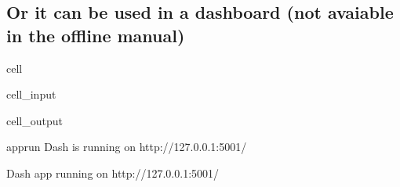 \documentclass[letterpaper,10pt,english]{jupyterBook}
\begin{document}
\subsection{Or it can be used in a dashboard (not avaiable in the offline manual)}
\label{\detokenize{content/06_ModelAnalytics/AttributionSomeFeatures:or-it-can-be-used-in-a-dashboard-not-avaiable-in-the-offline-manual}}
\begin{sphinxuseclass}{cell}\begin{sphinxVerbatimInput}

\begin{sphinxuseclass}{cell_input}
\begin{sphinxVerbatim}[commandchars=\\\{\}]
\end{sphinxVerbatim}

\end{sphinxuseclass}\end{sphinxVerbatimInput}
\begin{sphinxVerbatimOutput}

\begin{sphinxuseclass}{cell_output}
\begin{sphinxVerbatim}[commandchars=\\\{\}]
apprun
Dash is running on http://127.0.0.1:5001/
\end{sphinxVerbatim}

\begin{sphinxVerbatim}[commandchars=\\\{\}]
Dash app running on http://127.0.0.1:5001/
\end{sphinxVerbatim}

\end{sphinxuseclass}\end{sphinxVerbatimOutput}

\end{sphinxuseclass}
\end{document}
